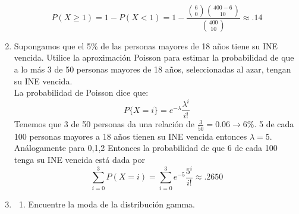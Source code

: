 \documentclass[11pt,a4paper]{report}
\begin{document}
\begin{enumerate}
{            $$P(X\geq 1)=1-P(X<1)=1-\frac{\binom{6}{0}\binom{400-6}{10}}{\binom{400}{10}}\approx .14$$
		}

		\item{
			Supongamos que el 5\% de las personas mayores de 18 años tiene su
            INE vencida. Utilice la aproximación Poisson para estimar la
            probabilidad de que a lo más 3 de 50 personas mayores de 18 años,
            seleccionadas al azar, tengan su INE vencida.\\
            La probabilidad de Poisson dice que:
            $$P\lbrace X=i \rbrace = e^{-\lambda} \frac{\lambda^{i}}{i!}$$
            Tenemos que 3 de 50 personas da una relación de $\frac{3}{50}=0.06 \rightarrow 6\%$. 5 de cada 100 personas mayores a 18 años tienen su INE vencida entonces $\lambda=5$. Análogamente para 0,1,2 Entonces la probabilidad de que 6 de cada 100 tenga su INE vencida está dada por
            $$\sum_{i=0}^{3}P(X=i)=\sum_{i=0}^{3}e^{-5}\frac{5^{i}}{i!}\approx .2650$$
          
		}

		\item{
			\begin{enumerate}
				\item {
					Encuentre la moda de la distribución gamma.


}
\end{enumerate}}
\end{enumerate}
\end{document}
